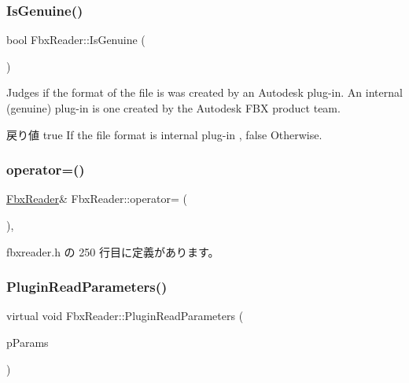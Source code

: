 \subsubsection{\texorpdfstring{Is\+Genuine()}{IsGenuine()}}
{\footnotesize\ttfamily bool Fbx\+Reader\+::\+Is\+Genuine (\begin{DoxyParamCaption}{ }\end{DoxyParamCaption})}

Judges if the format of the file is was created by an Autodesk plug-\/in. An internal (genuine) plug-\/in is one created by the Autodesk F\+BX product team. \begin{DoxyReturn}{戻り値}
{\ttfamily true} If the file format is internal plug-\/in , {\ttfamily false} Otherwise. 
\end{DoxyReturn}
\mbox{\label{class_fbx_reader_ab5a00e2bf3c80f5167a89149b96df57c}} 
\subsubsection{\texorpdfstring{operator=()}{operator=()}}
{\footnotesize\ttfamily \hyperlink{class_fbx_reader}{Fbx\+Reader}\& Fbx\+Reader\+::operator= (\begin{DoxyParamCaption}\item[{\hyperlink{class_fbx_reader}{Fbx\+Reader} const \&}]{ }\end{DoxyParamCaption})\hspace{0.3cm}{\ttfamily [inline]}, {\ttfamily [protected]}}



 fbxreader.\+h の 250 行目に定義があります。

\mbox{\label{class_fbx_reader_aa026634b699bea0df1b43850c08bb63a}} 
\subsubsection{\texorpdfstring{Plugin\+Read\+Parameters()}{PluginReadParameters()}}
{\footnotesize\ttfamily virtual void Fbx\+Reader\+::\+Plugin\+Read\+Parameters (\begin{DoxyParamCaption}\item[{\hyperlink{class_fbx_object}{Fbx\+Object} \&}]{p\+Params }\end{DoxyParamCaption})\hspace{0.3cm}{\ttfamily [virtual]}}

